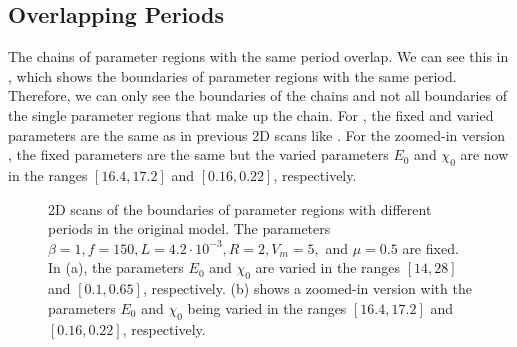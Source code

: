 \subsection{Overlapping Periods}

The chains of parameter regions with the same period overlap.
We can see this in , which shows the boundaries of parameter regions with the same period.
Therefore, we can only see the boundaries of the chains and not all boundaries of the single parameter regions that make up the chain.
For , the fixed and varied parameters are the same as in previous 2D scans like .
For the zoomed-in version , the fixed parameters are the same but the varied parameters $E_0$ and $\chi_0$ are now in the ranges $[16.4, 17.2]$ and $[0.16, 0.22]$, respectively.

\begin{figure}
	\centering
	\caption[2D scans of the boundaries of parameter regions with different periods in the original model]{
		2D scans of the boundaries of parameter regions with different periods in the original model.
		The parameters $\beta = 1, f = 150, L = 4.2 \cdot 10^{-3}, R = 2, V_m = 5,$ and $\mu = 0.5$ are fixed.
		In (a), the parameters $E_0$ and $\chi_0$ are varied in the ranges $[14, 28]$ and $[0.1, 0.65]$, respectively.
		(b) shows a zoomed-in version with the parameters $E_0$ and $\chi_0$ being varied in the ranges $[16.4, 17.2]$ and $[0.16, 0.22]$, respectively.
	}
	\label{fig:state.og.overlapping.chains}
\end{figure}

